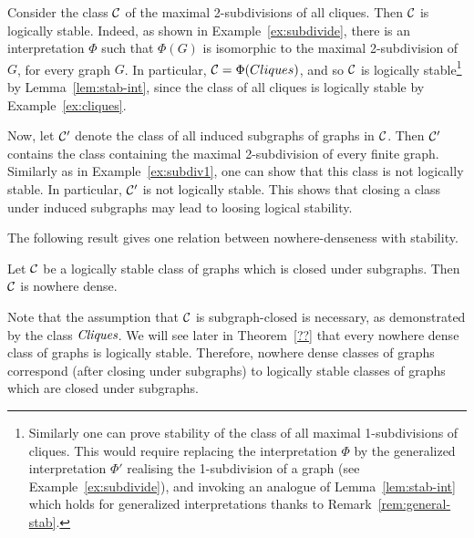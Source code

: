 	
\begin{example}\label{ex:subdiv2}
Consider the class ${\cal C}$ of the maximal 2-subdivisions of all cliques.  Then ${\cal C}$ is logically stable.
Indeed, as shown in Example~\ref{ex:subdivide}, there is an interpretation $\Phi$ such that  $\Phi(G)$ is isomorphic to the maximal 2-subdivision of $G$,
for every graph $G$. In particular, ${\cal C}=\Phi(Cliques)$, and so ${\cal C}$ is logically stable\footnote{Similarly one can prove stability of  the class of all maximal 1-subdivisions of cliques. This would require replacing the  interpretation $\Phi$ 
 by the generalized interpretation $\Phi'$
 realising 
  the 1-subdivision of a graph (see Example~\ref{ex:subdivide}), and invoking an analogue of Lemma~\ref{lem:stab-int} which holds  for generalized interpretations thanks to Remark~\ref{rem:general-stab}.
  } by Lemma~\ref{lem:stab-int}, since the class of all cliques is logically stable by Example~\ref{ex:cliques}.


Now, let ${\cal C}'$ denote the class of all induced subgraphs of graphs in ${\cal C}$.
Then ${\cal C}'$
contains the class containing the maximal 2-subdivision of every finite graph. Similarly as in
 Example~\ref{ex:subdiv1}, one can show that this class is not logically stable. In particular, ${\cal C}'$ is not logically stable.	This shows that closing a class under induced subgraphs may lead to loosing logical stability.
\end{example}
The following  result gives one relation between nowhere-denseness with stability. 

\begin{proposition}\label{prop:nd-stab}
  Let ${\cal C}$ be a logically stable class of graphs which is closed under subgraphs. Then ${\cal C}$  is nowhere dense.
\end{proposition}
Note that the assumption that ${\cal C}$ is subgraph-closed is  necessary, as demonstrated by the class $\textit{Cliques}$.
We will see later in Theorem~\ref{??} that every nowhere dense class of graphs is logically stable.
Therefore, nowhere dense classes of graphs correspond 
(after closing under subgraphs)
to logically stable classes of graphs which are closed under subgraphs. 




